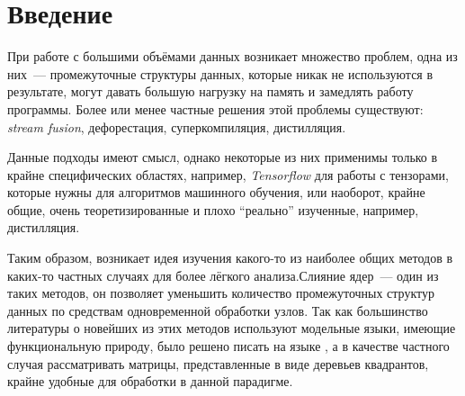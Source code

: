 
\section*{Введение}
При работе с большими объёмами данных возникает множество проблем, одна из них~--- промежуточные структуры данных, которые никак не используются в результате, могут давать большую нагрузку на память и замедлять работу программы. Более или менее частные решения этой проблемы существуют: \textit{stream fusion}, дефорестация, суперкомпиляция, дистилляция.

Данные подходы имеют смысл, однако некоторые из них применимы только в крайне специфических областях, например, \textit{Tensorflow} для работы с тензорами, которые нужны для алгоритмов машинного обучения, или наоборот, крайне общие, очень теоретизированные и плохо \enquote{реально} изученные, например, дистилляция.

Таким образом, возникает идея изучения какого-то из наиболее общих методов в каких-то частных случаях для более лёгкого анализа.Слияние ядер~--- один из таких методов, он позволяет уменьшить количество промежуточных структур данных по средствам одновременной обработки узлов. Так как большинство литературы о новейших из этих методов используют модельные языки, имеющие функциональную природу, было решено писать на языке \Haskell{}, а в качестве частного случая рассматривать матрицы, представленные в виде деревьев квадрантов, крайне удобные для обработки в данной парадигме.
% 
